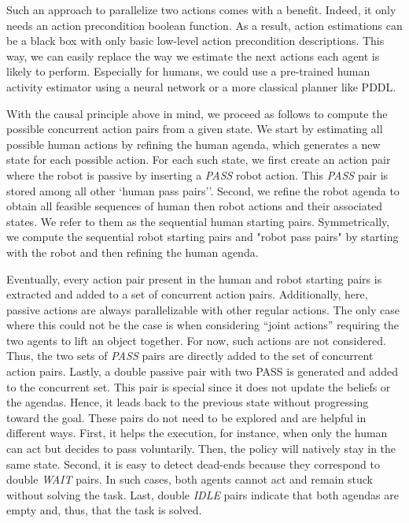 Such an approach to parallelize two actions comes with a benefit. Indeed, it only needs an action precondition boolean function. As a result, action estimations can be a black box with only basic low-level action precondition descriptions. This way, we can easily replace the way we estimate the next actions each agent is likely to perform. Especially for humans, we could use a pre-trained human activity estimator using a neural network or a more classical planner like PDDL. 

With the causal principle above in mind, we proceed as follows to compute the possible concurrent action pairs from a given state. We start by estimating all possible human actions by refining the human agenda, which generates a new state for each possible action. For each such state, we first create an action pair where the robot is passive by inserting a \textit{PASS} robot action. This \textit{PASS} pair is stored among all other `human pass pairs''. Second, we refine the robot agenda to obtain all feasible sequences of human then robot actions and their associated states. We refer to them as the sequential human starting pairs. Symmetrically, we compute the sequential robot starting pairs and "robot pass pairs" by starting with the robot and then refining the human agenda.

Eventually, every action pair present in the human and robot starting pairs is extracted and added to a set of concurrent action pairs. 
Additionally, here, passive actions are always parallelizable with other regular actions. The only case where this could not be the case is when considering ``joint actions'' requiring the two agents to lift an object together. For now, such actions are not considered. Thus, the two sets of \textit{PASS} pairs are directly added to the set of concurrent action pairs. 
Lastly, a double passive pair with two PASS is generated and added to the concurrent set. This pair is special since it does not update the beliefs or the agendas. Hence, it leads back to the previous state without progressing toward the goal. These pairs do not need to be explored and are helpful in different ways. First, it helps the execution, for instance, when only the human can act but decides to pass voluntarily. Then, the policy will natively stay in the same state. Second, it is easy to detect dead-ends because they correspond to double \textit{WAIT} pairs. In such cases, both agents cannot act and remain stuck without solving the task.  
Last, double \textit{IDLE} pairs indicate that both agendas are empty and, thus, that the task is solved. 

